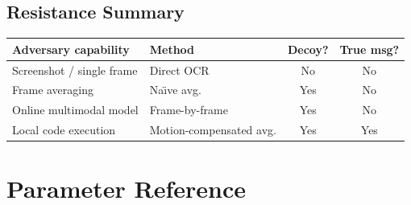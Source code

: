 \documentclass[12pt,a4paper]{article}
\begin{document}
\subsection{Resistance Summary}

\begin{center}
\renewcommand{\arraystretch}{1.3}
\begin{tabular}{p{4.5cm}p{4cm}cc}
\toprule
\textbf{Adversary capability} & \textbf{Method} &
  \textbf{Decoy?} & \textbf{True msg?} \\
\midrule
Screenshot / single frame    & Direct OCR           & No  & No  \\
Frame averaging              & Na\"{\i}ve avg.      & Yes & No  \\
Online multimodal model      & Frame-by-frame       & Yes & No  \\
Local code execution         & Motion-compensated avg. & Yes & Yes \\
\bottomrule
\end{tabular}
\end{center}

\section{Parameter Reference}
\end{document}
